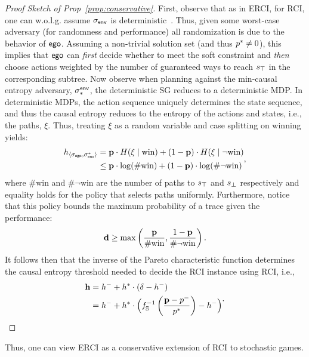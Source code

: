 \begin{proof}[Proof Sketch of Prop~\ref{prop:conservative}]

  First, observe that as in ERCI, for RCI, one can w.o.l.g. assume
  ${\sigma_{\mathsf{env}}}$ is deterministic~\cite{DBLP:conf/cav/FremontS18}.
  Thus, given some worst-case adversary (for randomness and
  performance) all randomization is due to the behavior of
  $\mathsf{ego}$. Assuming a non-trivial solution set (and thus
  $p^{*} \neq 0$), this implies that $\mathsf{ego}$ can \emph{first} decide
  whether to meet the soft constraint and \emph{then} choose actions
  weighted by the number of guaranteed ways to reach $s_{\top}$ in the
  corresponding subtree. Now observe when planning against the
  min-causal entropy adversary, $\sigma_*^{\mathsf{env}}$, the deterministic SG
  reduces to a deterministic MDP. In deterministic MDPs, the action
  sequence uniquely determines the state sequence, and thus the causal
  entropy reduces to the entropy of the actions and states, i.e., the
  paths, $\xi$.  Thus, treating $\xi$ as a random variable and
  case splitting on winning yields:
  \begin{equation}\label{eq:cond_win}
    \begin{split}
      h_{\langle \sched_\pOne, \sched^*_\pTwo\rangle} &= \scthreshold\cdot H(\xi \mid \text{win}) + (1 - \scthreshold)\cdot H(\xi \mid \neg \text{win})\\
      &\leq \scthreshold\cdot \log(\#\text{win}) + (1 - \scthreshold)\cdot \log(\#\neg
      \text{win})
    \end{split},
  \end{equation}
  where $\#\text{win}$ and $\#\neg \text{win}$ are the
  number of paths to $s_{\top}$ and $s_{\bot}$ respectively and equality holds
  for the policy that selects paths uniformly. Furthermore, notice that this policy
  bounds the maximum probability of a trace given the performance:
  \begin{equation}
    \mathbf{d} \geq \max\left(\frac{\mathbf{p}}{\#\text{win}}, \frac{ 1- \mathbf{p}}{\#\neg \text{win}}\right).
  \end{equation}
  It follows then that the inverse of the Pareto characteristic
  function determines the causal entropy threshold needed to decide the RCI instance
  using RCI, i.e.,
  \begin{equation}
    \begin{split}
      \mathbf{h} &= h^{-} + h^{*}\cdot (\delta - h^{-})\\
      &= h^{-} + h^{*} \cdot \Big (f_\mathbb{S}^{-1}\left(\frac{\mathbf{p} - p^{-}}{p^{*}}\right) - h^{-}\Big)
    \end{split}.
  \end{equation}
\end{proof}

Thus, one can view ERCI as a conservative extension of RCI to stochastic games.

